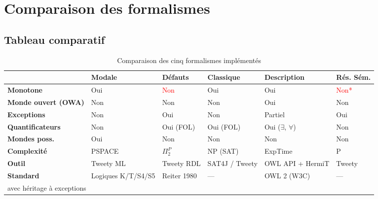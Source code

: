 \chapter{Comparaison des formalismes}

\section{Tableau comparatif}

\begin{table}[H]
\centering
\caption{Comparaison des cinq formalismes implémentés}
\label{tab:comparaison}
\renewcommand{\arraystretch}{1.4}
\begin{tabularx}{\linewidth}{lXXXXX}
\toprule
& \textbf{Modale} & \textbf{Défauts} & \textbf{Classique} & \textbf{Description} & \textbf{Rés. Sém.} \\
\midrule
\textbf{Monotone}
  & \textcolor{codegreen}{Oui}
  & \textcolor{red}{Non}
  & \textcolor{codegreen}{Oui}
  & \textcolor{codegreen}{Oui}
  & \textcolor{red}{Non*} \\

\textbf{Monde ouvert (OWA)}
  & Non
  & Non
  & Non
  & \textcolor{codegreen}{Oui}
  & Non \\

\textbf{Exceptions}
  & Non
  & \textcolor{codegreen}{Oui}
  & Non
  & Partiel
  & \textcolor{codegreen}{Oui} \\

\textbf{Quantificateurs}
  & Non
  & \textcolor{codegreen}{Oui (FOL)}
  & \textcolor{codegreen}{Oui (FOL)}
  & \textcolor{codegreen}{Oui ($\exists$, $\forall$)}
  & Non \\

\textbf{Mondes poss.}
  & \textcolor{codegreen}{Oui}
  & Non
  & Non
  & Non
  & Non \\

\textbf{Complexité}
  & PSPACE
  & $\Pi_2^P$
  & NP (SAT)
  & ExpTime
  & P \\

\textbf{Outil}
  & Tweety ML
  & Tweety RDL
  & SAT4J / Tweety
  & OWL API + HermiT
  & Tweety \\

\textbf{Standard}
  & Logiques K/T/S4/S5
  & Reiter 1980
  & ---
  & OWL 2 (W3C)
  & ---\\
\bottomrule
\multicolumn{6}{l}{\small * avec héritage à exceptions}
\end{tabularx}
\end{table}

